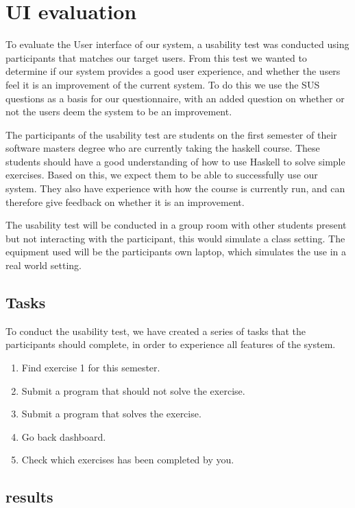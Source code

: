 \section{UI evaluation}
To evaluate the User interface of our system, a usability test was conducted using participants that matches our target users. From this test we wanted to determine if our system provides a good user experience, and whether the users feel it is an improvement of the current system.
To do this we use the SUS questions as a basis for our questionnaire, with an added question on whether or not the users deem the system to be an improvement.

The participants of the usability test are students on the first semester of their software masters degree who are currently taking the haskell course. 
These students should have a good understanding of how to use Haskell to solve simple exercises. Based on this, we expect them to be able to successfully use our system. They also have experience with how the course is currently run, and can therefore give feedback on whether it is an improvement.

The usability test will be conducted in a group room with other students present but not interacting with the participant, this would simulate a class setting. 
The equipment used will be the participants own laptop, which simulates the use in a real world setting.

\subsection*{Tasks}
To conduct the usability test, we have created a series of tasks that the participants should complete, in order to experience all features of the system.

\begin{enumerate}
    \item Find exercise 1 for this semester.
    \item Submit a program that should not solve the exercise.
    \item Submit a program that solves the exercise.
    \item Go back dashboard.
    \item Check which exercises has been completed by you.
\end{enumerate}



\subsection*{results}
